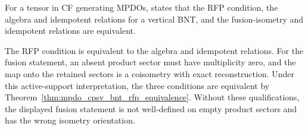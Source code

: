 \begin{theorem}
    \label{thm:cpsv_theorem414_printed_status}
    \notready
    For a tensor in CF generating MPDOs,
    \cite[Theorem~4.14]{Cirac2016MPDO_arXiv} states that the RFP
    condition, the algebra and idempotent relations for a vertical BNT,
    and the fusion-isometry and idempotent relations are equivalent.

    The RFP condition is equivalent to the algebra and idempotent
    relations. For the fusion statement, an absent product sector must have
    multiplicity zero, and the map onto the retained sectors is a coisometry
    with exact reconstruction. Under this active-support interpretation,
    the three conditions are equivalent by
    Theorem~\ref{thm:mpdo_cpsv_bnt_rfp_equivalence}. Without these
    qualifications, the displayed fusion statement is not well-defined on
    empty product sectors and has the wrong isometry orientation.
\end{theorem}

